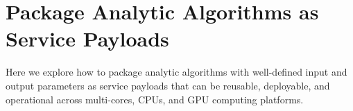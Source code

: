 
\section{Package Analytic Algorithms as Service Payloads}
\label{sec:package}

Here we explore how to package analytic algorithms with well-defined
input and output parameters as service payloads that can be reusable,
deployable, and operational across multi-cores, CPUs, and GPU
computing platforms.


